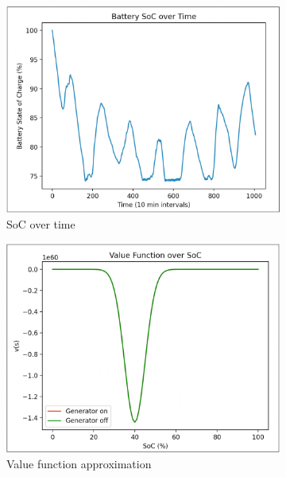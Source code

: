 \documentclass{article}
\begin{document}
\begin{figure}[H]
  \centering
  \begin{subfigure}[b]{0.3\linewidth}
    \includegraphics[width=\linewidth]{pics/rbfsocvtime.jpg}
    \caption{SoC over time}
  \end{subfigure}
  \begin{subfigure}[b]{0.3\linewidth}
    \includegraphics[width=\linewidth]{pics/rbfvaluefunc.jpg}
    \caption{Value function approximation}
  \end{subfigure}
  \begin{subfigure}[b]{0.3\linewidth}

\end{subfigure}
\end{figure}
\end{document}
